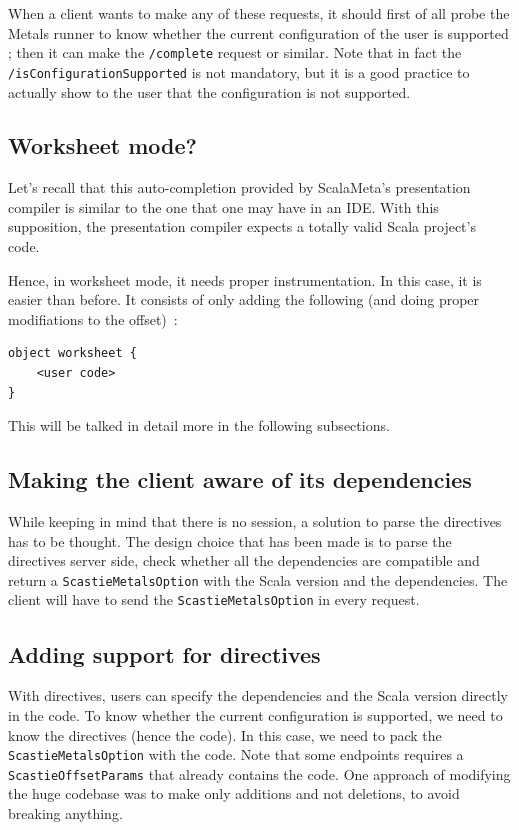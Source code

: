 \documentclass{article}
\begin{document}
When a client wants to make any of these requests, it should first of all probe the Metals runner to know whether the current configuration of the user is supported ; then it can make the \lstinline{/complete} request or similar. Note that in fact the \lstinline{/isConfigurationSupported} is not mandatory, but it is a good practice to actually show to the user that the configuration is not supported.

\subsection{Worksheet mode?}

Let's recall that this auto-completion provided by ScalaMeta's presentation compiler is similar to the one that one may have in an IDE. With this supposition, the presentation compiler expects a totally valid Scala project's code.

Hence, in worksheet mode, it needs proper instrumentation. In this case, it is easier than before. It consists of only adding the following (and doing proper modifiations to the offset)~:

\begin{lstlisting}
object worksheet {
    <user code>
}
\end{lstlisting}

This will be talked in detail more in the following subsections.

\subsection{Making the client aware of its dependencies}

While keeping in mind that there is no session, a solution to parse the directives has to be thought. The design choice that has been made is to parse the directives server side, check whether all the dependencies are compatible and return a \lstinline{ScastieMetalsOption} with the Scala version and the dependencies. The client will have to send the \lstinline{ScastieMetalsOption} in every request.

\subsection{Adding support for directives}

With directives, users can specify the dependencies and the Scala version directly in the code. To know whether the current configuration is supported, we need to know the directives (hence the code). In this case, we need to pack the \lstinline{ScastieMetalsOption} with the code. Note that some endpoints requires a \lstinline{ScastieOffsetParams} that already contains the code. One approach of modifying the huge codebase was to make only additions and not deletions, to avoid breaking anything.
\end{document}

